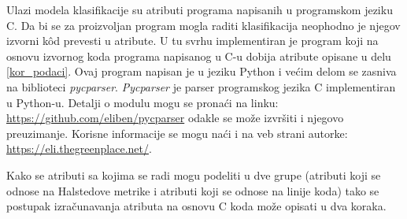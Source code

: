 \documentclass[12pt,oneside]{memoir}
\begin{document}
Ulazi modela klasifikacije su atributi programa napisanih u programskom jeziku C. Da bi se za proizvoljan program mogla raditi klasifikacija neophodno je njegov izvorni k\^od prevesti u atribute. U tu svrhu implementiran je program koji na osnovu izvornog koda programa napisanog u C-u dobija atribute opisane u delu \ref{kor_podaci}. Ovaj program napisan je u jeziku Python i većim delom se zasniva na biblioteci \textit{pycparser}. \textit{Pycparser} je parser programskog jezika C implementiran u Python-u. Detalji o modulu mogu se pronaći na linku: \url{https://github.com/eliben/pycparser} odakle se može izvršiti i njegovo preuzimanje. Korisne informacije se mogu naći i na veb strani autorke: \url{https://eli.thegreenplace.net/}.

Kako se atributi sa kojima se radi mogu podeliti u dve grupe (atributi koji se odnose na Halstedove metrike i atributi koji se odnose na linije koda) tako se postupak izračunavanja atributa na osnovu C koda može opisati u dva koraka. 
\end{document}
